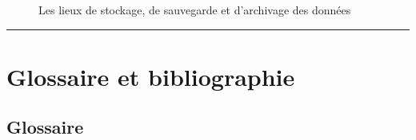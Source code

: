 \documentclass[letterpaper,10pt,english]{jupyterBook}
\begin{document}
\begin{figure}[htbp]
\centering
\capstart

\noindent{}
\caption{Les lieux de stockage, de sauvegarde et d’archivage des données}\label{\detokenize{script_analyse/synthese/main_results:q33-save-data}}\end{figure}


\bigskip\hrule\bigskip


\sphinxstepscope


\part{Glossaire et bibliographie}

\sphinxstepscope


\chapter{Glossaire}
\end{document}
